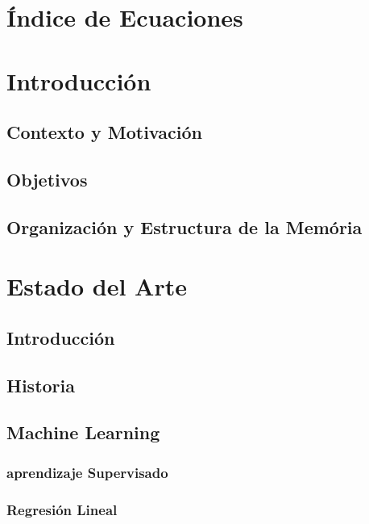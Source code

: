 \documentclass[a4paper,12pt]{article}
\begin{document}
\newpage

\section{Índice de Ecuaciones}

\section{Introducción}

\subsection{Contexto y Motivación}

\subsection{Objetivos}

\subsection{Organización y Estructura de la Memória}

\section{Estado del Arte}

\subsection{Introducción}

\subsection{Historia}

\subsection{Machine Learning}

\subsubsection{aprendizaje Supervisado}

\subsubsection{Regresión Lineal}
\end{document}
